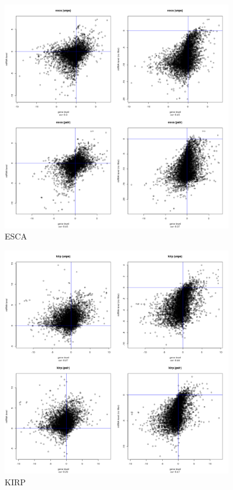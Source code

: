 \documentclass[a4paper,12pt]{article}
\begin{document}
\newpage

\begin{figure}[!h] 
\centering 
\includegraphics[width=0.9\textwidth]{plots/gene_vs_mirna_level_gsa_esca.png} 
\caption{ESCA} 
\end{figure} 

\newpage

\begin{figure}[!h] 
\centering 
\includegraphics[width=0.9\textwidth]{plots/gene_vs_mirna_level_gsa_kirp.png} 
\caption{KIRP} 
\end{figure} 
\end{document}
